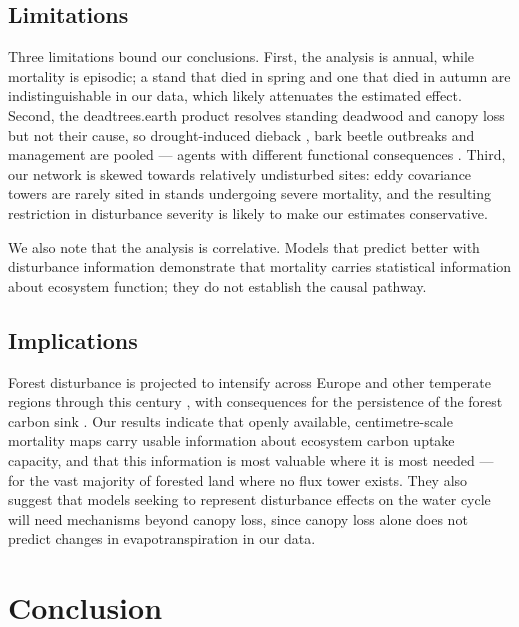 \documentclass[pdflatex,sn-nature]{sn-jnl}%
\theoremstyle{thmstyleone}%
\theoremstyle{thmstyletwo}%
\theoremstyle{thmstylethree}%
\begin{document}
\subsection{Limitations}

Three limitations bound our conclusions. First, the analysis is annual, while mortality is episodic; a stand that died in spring and one that died in autumn are indistinguishable in our data, which likely attenuates the estimated effect. Second, the deadtrees.earth product resolves standing deadwood and canopy loss but not their cause, so drought-induced dieback \cite{allen2010global,hammond2022global}, bark beetle outbreaks \cite{edburg2012cascading} and management are pooled --- agents with different functional consequences \cite{flower2015responses}. Third, our network is skewed towards relatively undisturbed sites: eddy covariance towers are rarely sited in stands undergoing severe mortality, and the resulting restriction in disturbance severity is likely to make our estimates conservative.

We also note that the analysis is correlative. Models that predict better with disturbance information demonstrate that mortality carries statistical information about ecosystem function; they do not establish the causal pathway.

\subsection{Implications}

Forest disturbance is projected to intensify across Europe and other temperate regions through this century \cite{grunig_climate_2026,besnard_natural_2025}, with consequences for the persistence of the forest carbon sink \cite{pan2011large,migliavacca_securing_2025}. Our results indicate that openly available, centimetre-scale mortality maps \cite{mosig2026deadtrees} carry usable information about ecosystem carbon uptake capacity, and that this information is most valuable where it is most needed --- for the vast majority of forested land where no flux tower exists. They also suggest that models seeking to represent disturbance effects on the water cycle will need mechanisms beyond canopy loss, since canopy loss alone does not predict changes in evapotranspiration in our data.

\section{Conclusion}\label{sec13}
\end{document}
